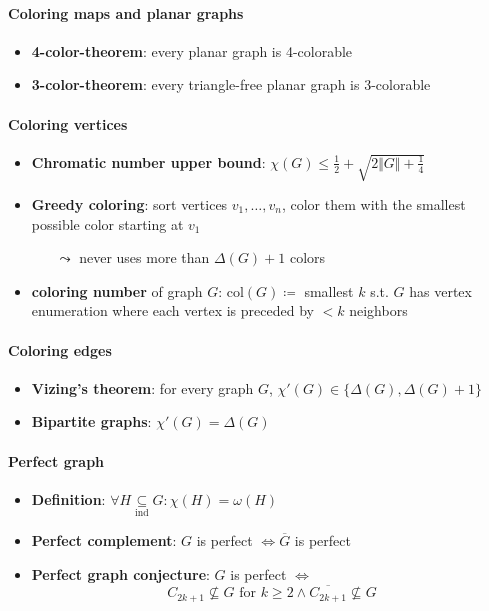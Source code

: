 \paragraph{Coloring maps and planar graphs}
\begin{itemize}
  \item \textbf{4-color-theorem}: every planar graph is 4-colorable
  \item \textbf{3-color-theorem}: every triangle-free planar graph is 3-colorable
\end{itemize}

\paragraph{Coloring vertices}
\begin{itemize}
  \item \textbf{Chromatic number upper bound}: $ \chi(G) \leq \frac{1}{2} + \sqrt{2\Vert G \Vert + \frac{1}{4}} $ 
  \item \textbf{Greedy coloring}: sort vertices $ v_1, \dots, v_n $, color them with the smallest possible color starting at $ v_1 $
  \begin{itemize}
    \item[$ \leadsto $] never uses more than $ \Delta(G) + 1 $ colors 
  \end{itemize}
  \item \textbf{coloring number} of graph $ G $: $ \text{col}(G) \coloneqq $ smallest $ k $ s.t. $ G $ has vertex enumeration where each vertex is preceded by $ < k $ neighbors
\end{itemize}

\paragraph{Coloring edges}
\begin{itemize}
  \item \textbf{Vizing's theorem}: for every graph $ G $, $ \chi'(G) \in \{ \Delta(G), \Delta(G) + 1 \} $
  \item \textbf{Bipartite graphs}: $ \chi'(G) = \Delta(G) $
\end{itemize}

\paragraph{Perfect graph}
\begin{itemize}
  \item \textbf{Definition}: $ \forall H \underset{\text{ind}}{\subseteq} G : \chi(H) = \omega(H) $
  \item \textbf{Perfect complement}: $ G $ is perfect $ \Leftrightarrow \overline{G} $ is perfect
  \item \textbf{Perfect graph conjecture}: $ G $ is perfect $ \Leftrightarrow $
    \begin{equation*}
      C_{2k+1} \not \subseteq G \text{ for } k \geq 2 \wedge \overline{C_{2k+1}} \not \subseteq G
    \end{equation*}
\end{itemize}

